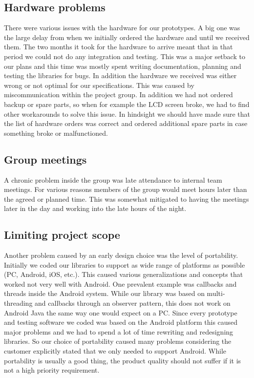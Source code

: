 \subsection{Hardware problems}
There were various issues with the hardware for our prototypes. A big one was the large delay
from when we initially ordered the hardware and until we received them. The two months it took
for the hardware to arrive meant that in that period we could not do any integration and testing.
This was a major setback to our plans and this time was mostly spent writing documentation, planning
and testing the libraries for bugs. In addition the hardware we received was either wrong or not
optimal for our specifications. This was caused by miscommunication within the project group. In
addition we had not ordered backup or spare parts, so when for example the LCD screen broke,
we had to find other workarounds to solve this issue. In hindsight we should have made sure that
the list of hardware orders was correct and ordered additional spare parts in case something broke
or malfunctioned.

\subsection{Group meetings}
A chronic problem inside the group was late attendance to internal team meetings. For various reasons members of
the group would meet hours later than the agreed or planned time. This was somewhat mitigated to having 
the meetings later in the day and working into the late hours of the night.

\subsection{Limiting project scope}
Another problem caused by an early design choice was the level of portability. Initially we coded our libraries to support as wide range of platforms as possible (PC, Android, iOS, etc.). This caused various generalizations and concepts that worked not very well with Android. One prevalent example was callbacks and threads inside the Android system. While our library was based on multi-threading and callbacks through an observer pattern, this does not work on Android Java the same way one would expect on a PC. Since every prototype and testing software we coded was based on the Android platform this caused major problems and we had to spend a lot of time rewriting and redesigning libraries. So our choice of portability caused many problems considering the customer explicitly stated that we only needed to support Android. While portability is usually a good thing, the product quality should not suffer if it is not a high priority requirement.

